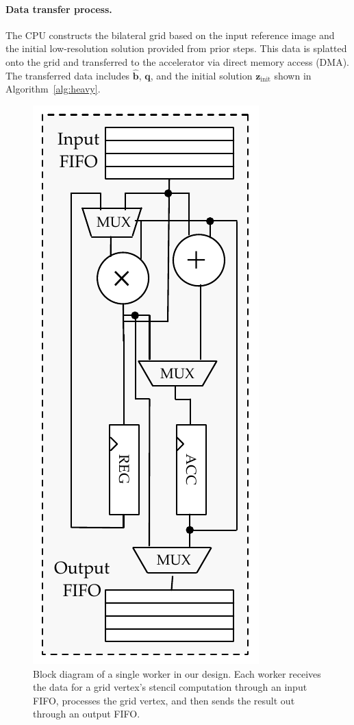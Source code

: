 \paragraph{Data transfer process. }The CPU constructs the bilateral grid based on the input reference image and the initial low-resolution solution provided from prior steps.
This data is splatted onto the grid and transferred to the accelerator via direct memory access (DMA).
The transferred data includes $\hat{\mathbf{b}}$, $\mathbf{q}$, and the initial solution $\mathbf{z}_{\mathrm{init}}$ shown in Algorithm~\ref{alg:heavy}.

\begin{figure}
\includegraphics[width=.75\columnwidth]{hfbs-figs/worker_microarchitecture.pdf}

\caption{Block diagram of a single worker in our design.
Each worker receives the data for a grid vertex's stencil computation through an input FIFO, processes the grid vertex, and then sends the result out through an output FIFO.
}
\label{fig:microarch-single-worker}

\end{figure}

